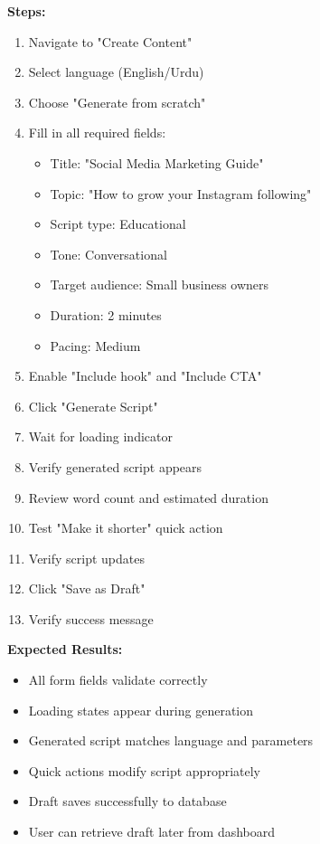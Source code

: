 \textbf{Steps:}
\begin{enumerate}
    \item Navigate to "Create Content"
    \item Select language (English/Urdu)
    \item Choose "Generate from scratch"
    \item Fill in all required fields:
    \begin{itemize}
        \item Title: "Social Media Marketing Guide"
        \item Topic: "How to grow your Instagram following"
        \item Script type: Educational
        \item Tone: Conversational
        \item Target audience: Small business owners
        \item Duration: 2 minutes
        \item Pacing: Medium
    \end{itemize}
    \item Enable "Include hook" and "Include CTA"
    \item Click "Generate Script"
    \item Wait for loading indicator
    \item Verify generated script appears
    \item Review word count and estimated duration
    \item Test "Make it shorter" quick action
    \item Verify script updates
    \item Click "Save as Draft"
    \item Verify success message
\end{enumerate}

\textbf{Expected Results:}
\begin{itemize}
    \item All form fields validate correctly
    \item Loading states appear during generation
    \item Generated script matches language and parameters
    \item Quick actions modify script appropriately
    \item Draft saves successfully to database
    \item User can retrieve draft later from dashboard
\end{itemize}

